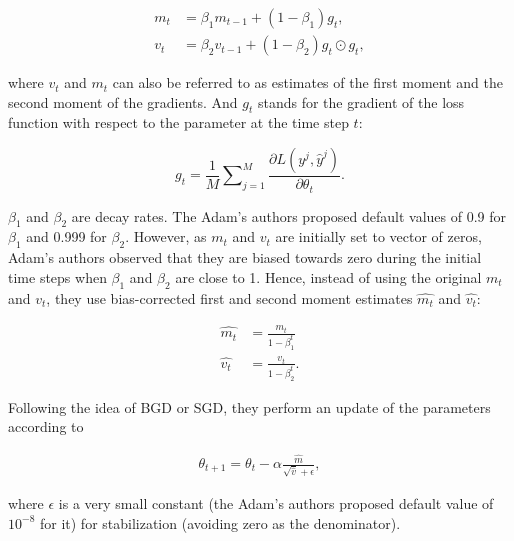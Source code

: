 \documentclass[
	parskip, 			   %
	twoside, 			   %
	DIV=14, 			   %
	BCOR=15.0mm, 		   %
	headsepline, 		   %
	open=right, 		   %
	captions=tableheading, %
	bibliography=totoc,    %
	numbers=noenddot       %
]{scrreprt}
\begin{document}
\begin{equation}
    \label{eq:moment_estimate}
    \begin{aligned}
        m_t &= \beta_1 m_{t-1} + (1-\beta_1) g_{t},
        \\
        v_t &= \beta_2 v_{t-1} + (1-\beta_2) g_{t} \odot g_{t},
    \end{aligned}
\end{equation}

where $v_t$ and $m_t$ can also be referred to as estimates of the first moment and the second moment of the gradients. And $g_{t}$ stands for the gradient of the loss function with respect to the parameter at the time step $t$:

\begin{equation}
    \label{eq:mean_gradient}
    g_{t} = \frac{1}{M} \sum\nolimits_{j=1}^M \frac{\partial L (y^j, \hat{y}^j)}{\partial \theta_{t}}.
\end{equation}

$\beta_1$ and $\beta_2$ are decay rates. The Adam's authors proposed default values of 0.9 for $\beta_1$ and 0.999 for $\beta_2$. However, as $m_t$ and $v_t$ are initially set to vector of zeros, Adam's authors observed that they are biased towards zero during the initial time steps when $\beta_1$ and $\beta_2$ are close to 1. Hence, instead of using the original $m_t$ and $v_t$, they use bias-corrected first and second moment estimates $\hat{m_t}$ and $\hat{v_t}$:

\begin{equation}
    \label{eq:corrected_moment_estimate}
    \begin{aligned}
        \hat{m_t} &= \frac{m_t}{1-\beta_1^t}
        \\
        \hat{v_t} &= \frac{v_t}{1-\beta_2^t}.
    \end{aligned}
\end{equation}

Following the idea of BGD or SGD, they perform an update of the parameters according to

\begin{equation}
    \label{eq:Adam_GD}
    \begin{aligned}
        \theta_{t+1} = \theta_{t} - \alpha \frac{\hat{m}}{\sqrt{\hat{v}} + \epsilon},
    \end{aligned}
\end{equation}

where $\epsilon$ is a very small constant (the Adam's authors proposed default value of $10^{-8}$ for it) for stabilization (avoiding zero as the denominator). 
\end{document}
